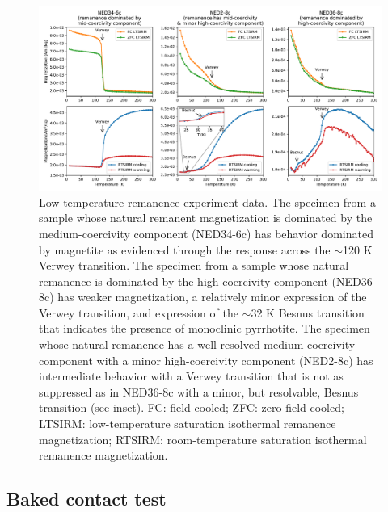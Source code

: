 \documentclass[draft]{agujournal2019}
\begin{document}
\begin{figure}[!ht]
\noindent\includegraphics[width=\textwidth]{./figures/MPMS_data.pdf}
\caption{\small{Low-temperature remanence experiment data. The specimen from a sample whose natural remanent magnetization is dominated by the medium-coercivity component (NED34-6c) has behavior dominated by magnetite as evidenced through the response across the $\sim$120 K Verwey transition. The specimen from a sample whose natural remanence is dominated by the high-coercivity component (NED36-8c) has weaker magnetization, a relatively minor expression of the Verwey transition, and expression of the $\sim$32 K Besnus transition that indicates the presence of monoclinic pyrrhotite. The specimen whose natural remanence has a well-resolved medium-coercivity component with a minor high-coercivity component (NED2-8c) has intermediate behavior with a Verwey transition that is not as suppressed as in NED36-8c with a minor, but resolvable, Besnus transition (see inset). FC: field cooled; ZFC: zero-field cooled; LTSIRM: low-temperature saturation isothermal remanence magnetization; RTSIRM: room-temperature saturation isothermal remanence magnetization.}}
\label{fig:MPMS_data}
\end{figure}

\subsection{Baked contact test}
\end{document}
